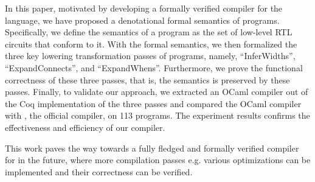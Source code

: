 
In this paper, motivated by developing a formally verified compiler for the {\firrtl} language, we have proposed a denotational formal semantics of {\firrtl} programs. Specifically, we define the semantics of a {\firrtl} program as the set of low-level RTL circuits that conform to it. 
With the formal semantics, we then formalized the three key lowering transformation passes of {\hifirrtl} programs, namely, ``InferWidths'', ``ExpandConnects'', and ``ExpandWhens''. Furthermore, we prove the functional correctness of these three passes, that is, the semantics is preserved by these passes. %
Finally, to validate our approach, we extracted an OCaml compiler out of the Coq implementation of the three passes and compared the OCaml compiler with {\firtool}, the official {\firrtl} compiler, on 113 programs. The experiment results confirms the effectiveness and efficiency of our compiler. 


This work paves the way towards a fully fledged and formally verified compiler for {\firrtl} in the future, where more compilation passes e.g. various optimizations can be implemented and their correctness can be verified. 